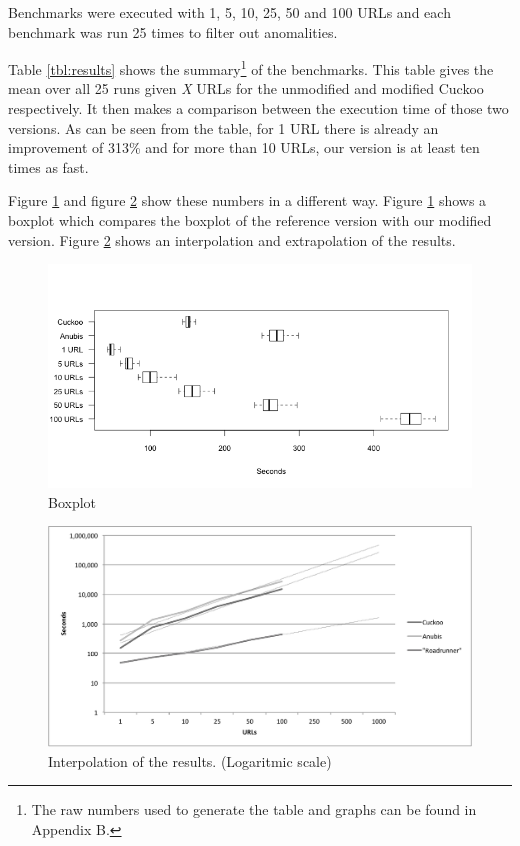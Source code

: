 Benchmarks were executed with 1, 5, 10, 25, 50 and 100 URLs and each benchmark was run 25 times to filter out anomalities.

Table \ref{tbl:results} shows the summary\footnote{The raw numbers used to generate the table and graphs can be found in Appendix B.} of the benchmarks. This table gives the mean over all 25 runs given \textit{X} URLs for the unmodified and modified Cuckoo respectively. It then makes a comparison between the execution time of those two versions. As can be seen from the table, for 1 URL there is already an improvement of 313\% and for more than 10 URLs, our version is at least ten times as fast.

Figure \ref{fig:chart-box} and figure \ref{fig:chart-trend} show these numbers in a different way. Figure \ref{fig:chart-box} shows a boxplot which compares the boxplot of the reference version with our modified version. Figure \ref{fig:chart-trend} shows an interpolation and extrapolation of the results.


\begin{figure}[h]
    \centering
    \centerline{\includegraphics[width=20cm]{Images/chart-box.png}}
    \caption{Boxplot}
    \label{fig:chart-box}
\end{figure}

\begin{figure}[h]
    \centering
    \centerline{\includegraphics[width=20cm]{Images/chart-trend}}
    \caption{Interpolation of the results. (Logaritmic scale)}
    \label{fig:chart-trend}
\end{figure}

